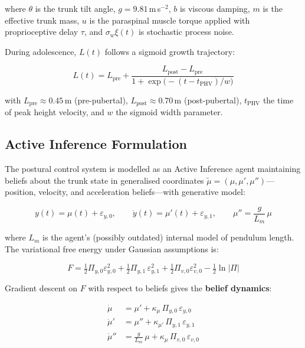 \documentclass[12pt, letterpaper]{article}
\newcommand{\Piy}{\Pi_{y,1}}
\newcommand{\epsy}{\varepsilon_{y,1}}
\newcommand{\Lm}{L_m}
\begin{document}
where $\theta$ is the trunk tilt angle, $g = 9.81$\,m\,s$^{-2}$, $b$ is
viscous damping, $m$ is the effective trunk mass, $u$ is the paraspinal muscle
torque applied with proprioceptive delay $\tau$, and $\sigma_w\xi(t)$
is stochastic process noise.

During adolescence, $L(t)$ follows a sigmoid growth trajectory:

\begin{equation}
  L(t) = L_{\mathrm{pre}}
    + \frac{L_{\mathrm{post}} - L_{\mathrm{pre}}}
           {1 + \exp\!\bigl(-(t - t_{\mathrm{PHV}})/w\bigr)}
  \label{eq:growth}
\end{equation}

with $L_{\mathrm{pre}} \approx 0.45$\,m (pre-pubertal), $L_{\mathrm{post}}
\approx 0.70$\,m (post-pubertal), $t_{\mathrm{PHV}}$ the time of peak height
velocity, and $w$ the sigmoid width parameter.

\subsection{Active Inference Formulation}

The postural control system is modelled as an Active Inference agent
maintaining beliefs about the trunk state in generalised coordinates
$\tilde{\mu} = (\mu, \mu', \mu'')$---position, velocity, and acceleration
beliefs---with generative model:

\begin{equation}
  y(t) = \mu(t) + \varepsilon_{y,0}, \qquad
  \dot{y}(t) = \mu'(t) + \varepsilon_{y,1}, \qquad
  \mu'' = \frac{g}{\Lm}\,\mu
  \label{eq:genmodel}
\end{equation}

where $\Lm$ is the agent's (possibly outdated) internal model of pendulum
length. The variational free energy under Gaussian assumptions is:

\begin{equation}
  F = \tfrac{1}{2}\Pi_{y,0}\varepsilon_{y,0}^{2}
    + \tfrac{1}{2}\Piy\,\epsy^{2}
    + \tfrac{1}{2}\Pi_{v,0}\varepsilon_{v,0}^{2}
    - \tfrac{1}{2}\ln|\Pi|
  \label{eq:FE}
\end{equation}

Gradient descent on $F$ with respect to beliefs gives the \textbf{belief
dynamics}:

\begin{align}
  \dot{\mu}   &= \mu' + \kappa_\mu\,\Pi_{y,0}\,\varepsilon_{y,0} \label{eq:bdyn1}\\
  \dot{\mu}'  &= \mu'' + \kappa_{\mu'}\,\Piy\,\epsy            \label{eq:bdyn2}\\
  \dot{\mu}'' &= \frac{g}{\Lm}\,\mu + \kappa_\mu\,\Pi_{v,0}\,\varepsilon_{v,0}
  \label{eq:bdyn3}
\end{align}
\end{document}
